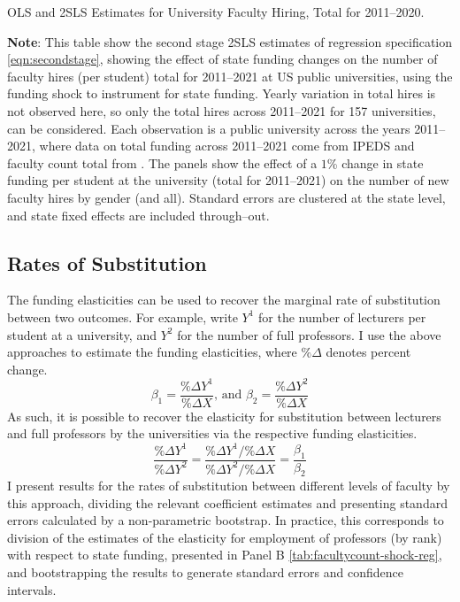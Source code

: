 \begin{table}[h!]
    \singlespacing
    \centering
    \caption{OLS and 2SLS Estimates for University Faculty Hiring, Total for 2011--2020.}
    \makebox[\textwidth][c]{}
    \label{tab:hiring-shock-reg}
    \justify
    \footnotesize
    \textbf{Note}: 
    This table show the second stage 2SLS estimates of regression specification \eqref{eqn:secondstage}, showing the effect of state funding changes on the number of faculty hires (per student) total for 2011--2021 at US public universities, using the funding shock to instrument for state funding.
    Yearly variation in total hires is not observed here, so only the total hires across 2011--2021 for 157 universities, can be considered.
    Each observation is a public university across the years 2011--2021, where data on total funding across 2011--2021 come from IPEDS and faculty count total from \citep{wapman2022quantifying,wapman2022zenodo}.
    The panels show the effect of a $1$\% change in state funding per student at the university (total for 2011--2021) on the number of new faculty hires by gender (and all).
    Standard errors are clustered at the state level, and state fixed effects are included through--out.
\end{table}


\newpage
\subsection{Rates of Substitution}
\label{sec:appendix-substitution}

The funding elasticities can be used to recover the marginal rate of substitution between two outcomes.
For example, write $Y^1$ for the number of lecturers per student at a university, and $Y^2$ for the number of full professors.
I use the above approaches to estimate the funding elasticities, where $\% \Delta$ denotes percent change.
\[ \beta_1 = \frac{\% \Delta Y^1}{\% \Delta X}
\text{, and }
\beta_2 = \frac{\% \Delta Y^2}{\% \Delta X} \]
As such, it is possible to recover the elasticity for substitution between lecturers and full professors by the universities via the respective funding elasticities.
\[ \frac{\% \Delta Y^1}{\% \Delta Y^2}
= \frac{\% \Delta Y^1 / \% \Delta X}{\% \Delta Y^2 / \% \Delta X}
= \frac{\beta_1}{\beta_2} \]
I present results for the rates of substitution between different levels of faculty by this approach, dividing the relevant coefficient estimates and presenting standard errors calculated by a non-parametric bootstrap.
In practice, this corresponds to division of the estimates of the elasticity for employment of professors (by rank) with respect to state funding, presented in Panel B \autoref{tab:facultycount-shock-reg}, and bootstrapping the results to generate standard errors and confidence intervals.

